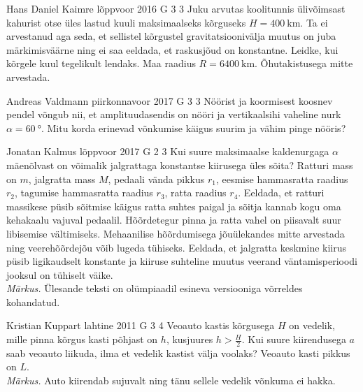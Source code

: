 \documentclass[11pt]{article}
\begin{document}
{%
{Hans Daniel Kaimre} %
{lõppvoor} %
{2016} %
{G 3} %
{3} %
{
\ifStatement
Juku arvutas koolitunnis ülivõimsast kahurist otse üles lastud kuuli maksimaalseks kõrguseks $H=\SI{400}{\km}$. Ta ei arvestanud aga seda, et sellistel kõrgustel gravitatsioonivälja muutus on juba märkimisväärne ning ei saa eeldada, et raskusjõud on konstantne. Leidke, kui kõrgele kuul tegelikult lendaks. Maa raadius $R=\SI{6400}{\km}$. Õhutakistusega mitte arvestada.
\fi
}

{Andreas Valdmann} %
{piirkonnavoor} %
{2017} %
{G 3} %
{3} %
{
\ifStatement
Nöörist ja koormisest koosnev pendel võngub nii, et amplituudasendis on nööri ja vertikaalsihi vaheline nurk $\alpha=\SI{60}{\degree}$. Mitu korda erinevad võnkumise käigus suurim ja vähim pinge nööris?
\fi
}

{Jonatan Kalmus} %
{lõppvoor} %
{2017} %
{G 2} %
{3} %
{
\ifStatement
Kui suure maksimaalse kaldenurgaga $\alpha$ mäenõlvast on võimalik jalgrattaga konstantse kiirusega üles sõita? Ratturi mass on $m$, jalgratta mass $M$, pedaali vända pikkus $r_1$, eesmise hammasratta raadius $r_2$, tagumise hammasratta raadius $r_3$, ratta raadius $r_4$. Eeldada, et ratturi massikese püsib sõitmise käigus ratta suhtes paigal ja sõitja kannab kogu oma kehakaalu vajuval pedaalil. Hõõrdetegur pinna ja ratta vahel on piisavalt suur libisemise vältimiseks. Mehaanilise hõõrdumisega jõuülekandes mitte arvestada ning veerehõõrdejõu võib lugeda tühiseks. Eeldada, et jalgratta keskmine kiirus püsib ligikaudselt konstante ja kiiruse suhteline muutus veerand väntamisperioodi jooksul on tühiselt väike.\\
\emph{Märkus.} Ülesande teksti on olümpiaadil esineva versiooniga võrreldes kohandatud.
\fi
}

{Kristian Kuppart} %
{lahtine} %
{2011} %
{G 3} %
{4} %
{
\ifStatement
Veoauto kastis kõrgusega $H$ on vedelik, mille pinna kõrgus kasti põhjast on 
$h$, kusjuures $h > \frac{H}{2}$. Kui suure kiirendusega $a$ saab veoauto 
liikuda, ilma et vedelik kastist välja voolaks? Veoauto kasti pikkus on $L$.\\
\textit{Märkus.} Auto kiirendab sujuvalt ning tänu sellele vedelik võnkuma ei hakka.
\fi
}

}
\end{document}

